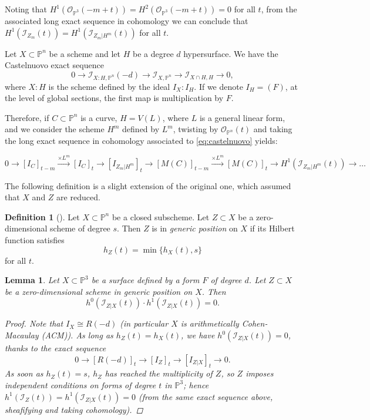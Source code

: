 \documentclass[12pt]{amsart}%
\numberwithin{equation}{section}
\newtheorem{lemma}[theorem]{Lemma}
\theoremstyle{definition}
\newtheorem{definition}[theorem]{Definition}
\numberwithin{equation}{section}
\newcommand{\PP}{ \ensuremath{\mathbb{P}}}
\begin{document}
Noting that $H^1(\mathcal O_{\mathbb P^3}(-m+t))=H^2(\mathcal O_{\mathbb P^3}(-m+t))=0$ for all $t$, from the associated long exact sequence in cohomology we can conclude that $H^1(\mathcal I_{Z_m}(t)) = H^1(\mathcal I_{Z_m|H^m}(t))$ for all $t$. 



{Let $X\subset \PP^n$ be a scheme and let $H$ be a degree $d$ hypersurface. We have the Castelnuovo exact sequence \begin{equation}\label{eq:castelnuovo}
0\to \mathcal I_{X:H,\PP^n}(-d)\to \mathcal I_{X,\PP^n}\to \mathcal I_{X\cap H,H}\to 0,
\end{equation}
where $X:H$ is the scheme defined by the ideal $I_X:I_H$. If we denote $I_H=(F)$, at the level of global sections, the first map is multiplication by $F$.}

{Therefore, if $C \subset\PP^n$ is a curve, $H=V(L)$, where $L$ is a general linear form, and we consider the scheme $H^m$ defined by $L^m$, twisting by $\mathcal O_{\PP^n}(t)$ and taking the long exact sequence in cohomology associated to \eqref{eq:castelnuovo} yields:}

\begin{equation} \label{usual 3}
0 \rightarrow [I_C]_{t-m} \stackrel{\times L^m}{\longrightarrow} [I_C]_t \rightarrow [I_{Z_m | H^m}]_t \rightarrow [M(C)]_{t-m} \stackrel{\times L^m}{\longrightarrow} [M(C)]_t \rightarrow H^1(\mathcal I_{Z_m|H^m}(t)) \rightarrow \dots 
\end{equation}

The following definition is a slight extension of the original one, which assumed that $X$ and $Z$ are reduced.

\begin{definition}[\cite{GMR}]
    Let $X \subset \PP^n$ be a closed subscheme. Let $Z \subset X$ be a zero-dimensional scheme of degree $s$. Then $Z$ is in {\it generic position} on $X$ if its Hilbert function satisfies
    \[
    h_Z(t) = \min \{ h_X(t), s \}
    \]
    for all $t$.
\end{definition}

\begin{lemma} \label{h0h1=0}
    Let $X \subset \PP^3$ be a surface defined by a form $F$ of degree $d$. Let $Z \subset X$ be a zero-dimensional scheme in generic position on $X$. Then
    \[
    h^0(\mathcal I_{Z|X} (t)) \cdot h^1(\mathcal I_{Z|X} (t)) = 0.
    \]

    \begin{proof}
    Note that $I_X \cong R(-d)$ (in particular $X$ is arithmetically Cohen-Macaulay (ACM)).
As long as $h_Z(t) = h_X(t)$, we have $h^0(\mathcal I_{Z|X} (t)) = 0$, thanks to the exact sequence
\[
0 \rightarrow [R(-d)]_t \rightarrow [I_Z]_t \rightarrow [I_{Z|X}]_t \rightarrow 0.
\]
As soon as $h_Z(t) = s$, $h_Z$ has reached the multiplicity of $Z$, so $Z$ imposes independent conditions on forms of degree $t$ in $\PP^3$; hence $h^1(\mathcal I_Z(t)) = h^1(\mathcal I_{Z|X}(t)) = 0$ (from the same exact sequence above, sheafifying and taking cohomology).
    \end{proof}
\end{lemma}
\end{document}
